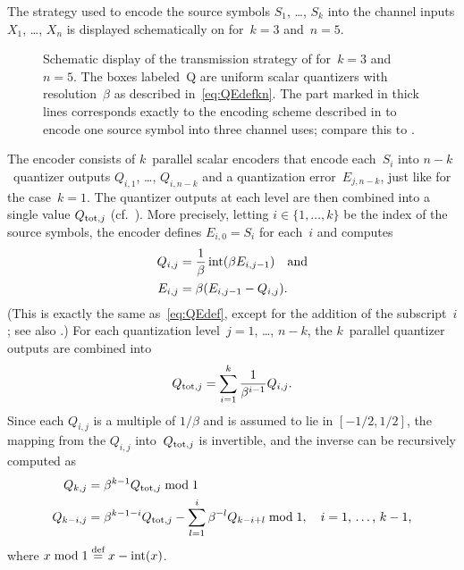 The strategy used to encode the source symbols $S_1$, \dots, $S_k$ into the
channel inputs $X_1$, \dots, $X_n$ is displayed schematically on
 for~$k=3$ and~$n=5$. 
\begin{figure}[tbp]
  \begin{center}
    
  \end{center}
  \caption{Schematic display of the transmission strategy of 
  for~$k = 3$ and~$n=5$. The boxes labeled~\textsf{Q} are uniform scalar
  quantizers with resolution~$\beta$ as described in~\eqref{eq:QEdefkn}. The
  part marked in thick lines corresponds exactly to the encoding scheme
  described in  to encode one source symbol into three
  channel uses; compare this to .}
  \label{fig:knencoding}
\end{figure}
The encoder consists of $k$~parallel scalar encoders that encode each~$S_i$ into
$n-k$~quantizer outputs $Q_{i,1}$, \dots, $Q_{i,n-k}$ and a quantization
error~$E_{j,n-k}$, just like for the case~$k=1$. The quantizer outputs at each
level are then combined into a single value $Q_{\operatorname{tot},j}$
(cf.~). More precisely, letting $i \in \{1, \dots, k\}$ be
the index of the source symbols, the encoder defines $E_{i,0} = S_i$ for
each~$i$ and computes
\begin{align}
  Q_{i,j} &= \frac{1}{\beta} \operatorname{int}(\beta E_{i,j-1}) \quad\text{and} \nonumber \\
  E_{i,j} &= \beta(E_{i,j-1} - Q_{i,j}). \label{eq:QEdefkn}
\end{align}
(This is exactly the same as~\eqref{eq:QEdef}, except for the addition of the
subscript~$i$; see also .) For each quantization level~$j =
1$, \dots, $n-k$, the $k$~parallel quantizer outputs are combined into
\begin{equation}
  \label{eq:Qtot}
  Q_{\operatorname{tot},j} = \sum_{i=1}^k \frac{1}{\beta^{i-1}} Q_{i,j}.
\end{equation}
Since each $Q_{i,j}$ is a multiple of $1/\beta$ and is assumed to lie in $[-1/2,
1/2]$, the mapping from the $Q_{i,j}$ into~$Q_{\operatorname{tot},j}$ is invertible, and the
inverse can be recursively computed as
\begin{align}
  Q_{k,j} &= \beta^{k-1} Q_{\operatorname{tot},j} \bmod 1 \nonumber \\
  Q_{k-i,j} &= \beta^{k-1-i} Q_{\operatorname{tot},j} - \sum_{l = 1}^i \beta^{-l} Q_{k - i +
  l} \bmod 1, \quad\text{$i = 1$, \dots, $k-1$,} 
  \label{eq:Qtotinv}
\end{align}
where $x \bmod 1 \stackrel{\text{def}}{=} x - \operatorname{int}(x)$.

